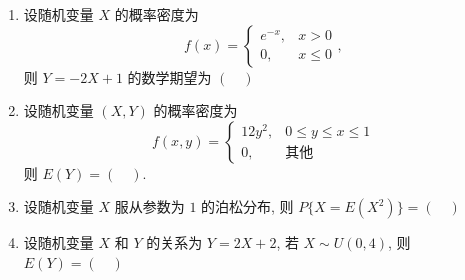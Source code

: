 \begin{enumerate}
  \item 设随机变量 $X$ 的概率密度为
  \begin{equation*}
    f(x)=
    \begin{cases}
      e^{-x}, & x>0\\
      0,      & x\le 0
    \end{cases},
  \end{equation*}
  则 $Y=-2X+1$ 的数学期望为 $(\quad)$

  \item 设随机变量 $(X,Y)$ 的概率密度为
  \begin{equation*}
    f(x,y)=
    \begin{cases}
      12y^{2}, & 0\le y\le x\le 1\\
      0,       & \text{其他}
    \end{cases}
  \end{equation*}
  则 $E(Y)=(\quad)$.

  \item 设随机变量 $X$ 服从参数为 $1$ 的泊松分布, 则 $P\{X=E(X^{2})\}=(\quad)$

  \item 设随机变量 $X$ 和 $Y$ 的关系为 $Y=2X+2$, 若 $X\sim U(0,4)$, 则 $E(Y)=(\quad)$


\end{enumerate}

